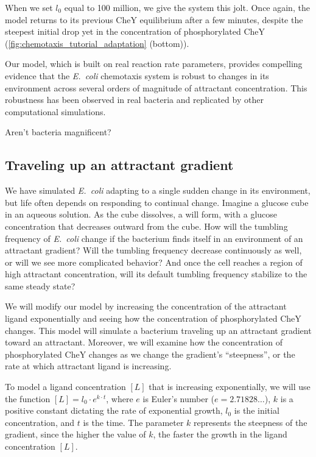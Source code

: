 When we set $l_0$ equal to 100 million, we give the system this jolt. Once again, the model returns to its previous CheY equilibrium after a few minutes, despite the steepest initial drop yet in the concentration of phosphorylated CheY (\autoref{fig:chemotaxis_tutorial_adaptation} (bottom)).

Our model, which is built on real reaction rate parameters, provides compelling evidence that the \textit{E.~coli} chemotaxis system is robust to changes in its environment across several orders of magnitude of attractant concentration. This robustness has been observed in real bacteria and replicated by other computational simulations.

Aren't bacteria magnificent?

\FloatBarrier
{}
\subsection{Traveling up an attractant gradient}

We have simulated \textit{E.~coli} adapting to a single sudden change in its environment, but life often depends on responding to continual change. Imagine a glucose cube in an aqueous solution. As the cube dissolves, a  will form, with a glucose concentration that decreases outward from the cube. How will the tumbling frequency of \textit{E.~coli} change if the bacterium finds itself in an environment of an attractant gradient?  Will the tumbling frequency decrease continuously as well, or will we see more complicated behavior? And once the cell reaches a region of high attractant concentration, will its default tumbling frequency stabilize to the same steady state?

We will modify our model by increasing the concentration of the attractant ligand exponentially and seeing how the concentration of phosphorylated CheY changes. This model will simulate a bacterium traveling up an attractant gradient toward an attractant. Moreover, we will examine how the concentration of phosphorylated CheY changes as we change the gradient's ``steepness'', or the rate at which attractant ligand is increasing.


To model a ligand concentration $[L]$ that is increasing exponentially, we will use the function $[L] = l_0 \cdot e^{k \cdot t}$, where $e$ is Euler's number ($e = 2.71828\ldots$), $k$ is a positive constant dictating the rate of exponential growth, $l_0$ is the initial concentration, and $t$ is the time. The parameter $k$ represents the steepness of the gradient, since the higher the value of $k$, the faster the growth in the ligand concentration $[L]$.


